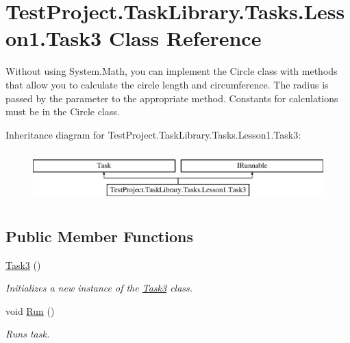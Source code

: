 \hypertarget{class_test_project_1_1_task_library_1_1_tasks_1_1_lesson1_1_1_task3}{}\section{Test\+Project.\+Task\+Library.\+Tasks.\+Lesson1.\+Task3 Class Reference}
\label{class_test_project_1_1_task_library_1_1_tasks_1_1_lesson1_1_1_task3}


Without using System.\+Math, you can implement the Circle class with methods that allow you to calculate the circle length and circumference. The radius is passed by the parameter to the appropriate method. Constants for calculations must be in the Circle class.  


Inheritance diagram for Test\+Project.\+Task\+Library.\+Tasks.\+Lesson1.\+Task3\+:\begin{figure}[H]
\begin{center}
\leavevmode
\includegraphics[height=2.000000cm]{class_test_project_1_1_task_library_1_1_tasks_1_1_lesson1_1_1_task3}
\end{center}
\end{figure}
\subsection*{Public Member Functions}
\begin{DoxyCompactItemize}
\item 
\mbox{\hyperlink{class_test_project_1_1_task_library_1_1_tasks_1_1_lesson1_1_1_task3_a0410dbb11a62d4c6ff09f04e347a66ab}{Task3}} ()
\begin{DoxyCompactList}\small\item\em Initializes a new instance of the \mbox{\hyperlink{class_test_project_1_1_task_library_1_1_tasks_1_1_lesson1_1_1_task3}{Task3}} class. \end{DoxyCompactList}\item 
void \mbox{\hyperlink{class_test_project_1_1_task_library_1_1_tasks_1_1_lesson1_1_1_task3_a3cff5e92fe16f7e1c765ade17d53e279}{Run}} ()
\begin{DoxyCompactList}\small\item\em Runs task. \end{DoxyCompactList}\end{DoxyCompactItemize}


